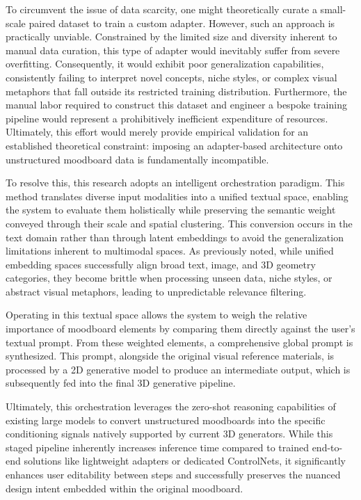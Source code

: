 To circumvent the issue of data scarcity, one might theoretically curate a small-scale paired dataset to train a custom adapter. However, such an approach is practically unviable. Constrained by the limited size and diversity inherent to manual data curation, this type of adapter would inevitably suffer from severe overfitting. Consequently, it would exhibit poor generalization capabilities, consistently failing to interpret novel concepts, niche styles, or complex visual metaphors that fall outside its restricted training distribution. Furthermore, the manual labor required to construct this dataset and engineer a bespoke training pipeline would represent a prohibitively inefficient expenditure of resources. Ultimately, this effort would merely provide empirical validation for an established theoretical constraint: imposing an adapter-based architecture onto unstructured moodboard data is fundamentally incompatible.

To resolve this, this research adopts an intelligent orchestration paradigm. This method translates diverse input modalities into a unified textual space, enabling the system to evaluate them holistically while preserving the semantic weight conveyed through their scale and spatial clustering. This conversion occurs in the text domain rather than through latent embeddings to avoid the generalization limitations inherent to multimodal spaces. As previously noted, while unified embedding spaces successfully align broad text, image, and 3D geometry categories, they become brittle when processing unseen data, niche styles, or abstract visual metaphors, leading to unpredictable relevance filtering.

Operating in this textual space allows the system to weigh the relative importance of moodboard elements by comparing them directly against the user's textual prompt. From these weighted elements, a comprehensive global prompt is synthesized. This prompt, alongside the original visual reference materials, is processed by a 2D generative model to produce an intermediate output, which is subsequently fed into the final 3D generative pipeline.

Ultimately, this orchestration leverages the zero-shot reasoning capabilities of existing large models to convert unstructured moodboards into the specific conditioning signals natively supported by current 3D generators. While this staged pipeline inherently increases inference time compared to trained end-to-end solutions like lightweight adapters or dedicated ControlNets, it significantly enhances user editability between steps and successfully preserves the nuanced design intent embedded within the original moodboard.

